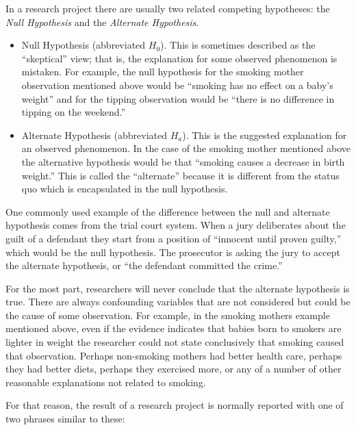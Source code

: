 In a research project there are usually two related competing hypotheses: the \textit{Null Hypothesis} and the \textit{Alternate Hypothesis}. 

\begin{itemize}
  \item Null Hypothesis (abbreviated $ H_{0} $). This is sometimes described as the ``skeptical'' view; that is, the explanation for some observed phenomenon is mistaken. For example, the null hypothesis for the smoking mother observation mentioned above would be ``smoking has no effect on a baby's weight'' and for the tipping observation would be ``there is no difference in tipping on the weekend.''
  \item Alternate Hypothesis (abbreviated $ H_{a} $). This is the suggested explanation for an observed phenomenon. In the case of the smoking mother mentioned above the alternative hypothesis would be that ``smoking causes a decrease in birth weight.'' This is called the ``alternate'' because it is different from the status quo which is encapsulated in the null hypothesis.
\end{itemize}

One commonly used example of the difference between the null and alternate hypothesis comes from the trial court system. When a jury deliberates about the guilt of a defendant they start from a position of ``innocent until proven guilty,'' which would be the null hypothesis. The prosecutor is asking the jury to accept the alternate hypothesis, or ``the defendant committed the crime.'' 

For the most part, researchers will never conclude that the alternate hypothesis is true. There are always confounding variables that are not considered but could be the cause of some observation. For example, in the smoking mothers example mentioned above, even if the evidence indicates that babies born to smokers are lighter in weight the researcher could not state conclusively that smoking caused that observation. Perhaps non-smoking mothers had better health care, perhaps they had better diets, perhaps they exercised more, or any of a number of other reasonable explanations not related to smoking. 

For that reason, the result of a research project is normally reported with one of two phrases similar to these: 

